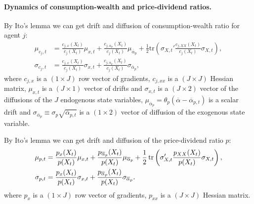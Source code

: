 \paragraph{Dynamics of consumption-wealth and price-dividend ratios.}
By Ito's lemma we can get drift and diffusion of consumption-wealth ratio for agent $ j $:
\begin{align}
	\mu_{c_{j},t}&=\frac{c_{j,x}(X_t)}{c_j(X_t)}\mu_{x,t}+\frac{c_{j,\overline{\alpha}_p}(X_t)}{c_j(X_t)}\mu_{\overline{\alpha}_p}+
	\frac{1}{2}\text{tr}\left(\sigma_{X,t}'\frac{c_{j,XX}(X_t)}{c_j(X_t)}\sigma_{X,t}\right)\label{eq:mu-cj},\\%
	\sigma_{c_j,t}&=\frac{c_{j,x}(X_t)}{c_j(X_t)} \sigma_{x,t} + \frac{c_{j,{\overline{\alpha}_p}}(X_t)}{c_j(X_t)}\sigma_{\overline{\alpha}_p}, \label{eq:sigma-cj}
\end{align}
where $ c_{j,x} $ is a $ (1\times J )$ row vector of gradients, $ c_{j,xx} $ is a $ (J\times J) $ Hessian matrix, $ \mu_{x,t} $ is a $ (J\times 1) $ vector of drifts and $ \sigma_{x,t} $ is a $ (J\times2) $ vector of the diffusions of the $ J $ endogenous state variables, $\mu_{\overline{\alpha}_p}= \theta_p\left(\overline{\alpha}-\overline{\alpha}_{p,t}\right) $ is a scalar drift and $ \sigma_{\overline{\alpha}_p}\equiv \sigma_{p} \sqrt{\overline{\alpha}_{p,t}} $ is a $ (1\times 2) $ vector of diffusion of the exogenous state variable.

By Ito's lemma we can get drift and diffusion of the price-dividend ratio $ p $:
\begin{align}
	\mu_{p,t}&=\frac{p_x(X_t)}{p(X_t)}\mu_{x,t}+\frac{p_{\overline{\alpha}_p}(X_t)}{p(X_t)}\mu_{\overline{\alpha}_p}+\frac{1}{2}\operatorname{tr}\left(\sigma_{X,t}'\frac{p_{XX}(X_t)}{p(X_t)}\sigma_{X,t}\right),\\
	\sigma_{p,t} &= \frac{p_x(X_t)}{p(X_t)} \sigma_{x,t} + \frac{p_{\overline{\alpha}_p}(X_t)}{p(X_t)} \sigma_{\overline{\alpha}_p}. 
\end{align}
where $ p_{x} $ is a $ (1\times J) $ row vector of gradients, $ p_{xx} $ is a $ (J\times J) $ Hessian matrix. 

